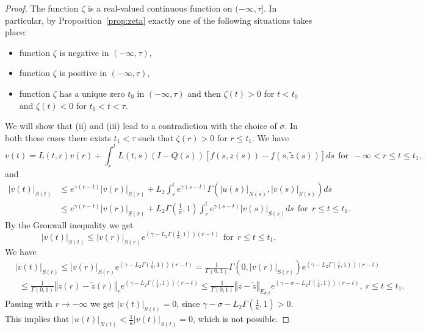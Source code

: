 \documentclass[a4paper,11pt,reqno]{amsart}
\theoremstyle{plain}
\theoremstyle{definition}
\numberwithin{equation}{section}
\newcommand{\norm}[1]{\left\Vert#1\right\Vert}
\renewcommand{\leq}{\leqslant}
\begin{document}
\begin{proof}
The function $\zeta$ is a real-valued continuous function on $(-\infty,\tau]$. In particular, by Proposition~\ref{prop:zeta} exactly one of the following situations takes place:
\begin{itemize}
\item[(i)] function $\zeta$ is negative in $(-\infty,\tau)$,
\item[(ii)] function $\zeta$ is positive in $(-\infty,\tau)$,
\item[(iii)] function $\zeta$ has a unique zero $t_0$ in $(-\infty,\tau)$ and
then $\zeta(t)>0$ for $t<t_0$ and $\zeta(t)<0$ for $t_0<t<\tau$. 
\end{itemize} 
We will show that (ii) and (iii) lead to a contradiction with the choice of $\sigma$. In both these cases there exists $t_1<\tau$ such that $\zeta(r)>0$ for $r\leq t_1$. We have
$$v(t)=L(t,r)v(r)+\int_{r}^{t}L(t,s)(I-Q(s))[f(s,z(s))-f(s,\tilde z(s))]ds\ \ \text{for}\ \ -\infty<r\leq t\leq t_1,$$
and
\begin{align*}
|v(t)|_{S(t)}&\leq e^{\gamma(r-t)}|v(r)|_{S(r)}+L_2\int_{r}^{t}e^{\gamma(s-t)}\Gamma(|u(s)|_{N(s)},|v(s)|_{S(s)})ds\\
&\leq e^{\gamma(r-t)}|v(r)|_{S(r)}+L_2\Gamma\left(\frac{1}{\kappa},1\right)\int_{r}^{t}e^{\gamma(s-t)}|v(s)|_{S(s)}ds\ \ \text{for}\ \ r\leq t\leq t_1.
\end{align*}
By the Gronwall inequality we get
$$|v(t)|_{S(t)}\leq |v(r)|_{S(r)}e^{\left(\gamma-L_2\Gamma\left(\frac{1}{\kappa},1\right)\right)(r-t)}\ \ \text{for}\ \ r\leq t\leq t_1.$$
We have
\begin{align*}
	&|v(t)|_{S(t)}\leq |v(r)|_{S(r)}e^{\left(\gamma-L_2\Gamma\left(\frac{1}{\kappa},1\right)\right)(r-t)}=\frac{1}{\Gamma(0,1)}\Gamma(0,|v(r)|_{S(r)})e^{\left(\gamma-L_2\Gamma\left(\frac{1}{\kappa},1\right)\right)(r-t)}\\
& \ \ \leq\frac{1}{\Gamma(0,1)}\norm{z(r)-\tilde z(r)}_{r}e^{\left(\gamma-L_2\Gamma\left(\frac{1}{\kappa},1\right)\right)(r-t)}\leq \frac{1}{\Gamma(0,1)}\norm{z-\tilde z}_{E_{\sigma,t}}e^{\left(\gamma-\sigma-L_2\Gamma\left(\frac{1}{\kappa},1\right)\right)(r-t)},\ r\leq t\leq t_1.
\end{align*}
Passing with $r\to-\infty$ we get $|v(t)|_{S(t)}=0$, since $\gamma-\sigma-L_2\Gamma\left(\frac{1}{\kappa},1\right)>0$.
This implies that $|u(t)|_{N(t)}<\frac{1}{\kappa}|v(t)|_{S(t)}=0$, which is not possible. 
\end{proof}
\end{document}
